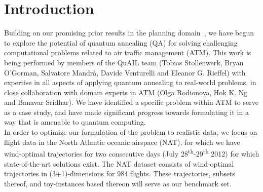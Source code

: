 \section*{Introduction}\label{sec:intro}
Building on our promising prior results in the planning domain~\cite{rieffel:15,venturelli:15},
we have begun to explore the potential of quantum annealing (QA) for solving challenging computational problems related to air traffic management (ATM)\cite{rodionova:16, rodionova:thesis15}.
This work is being performed by members of the QuAIL team (Tobias Stollenwerk, Bryan O'Gorman, Salvatore Mandr\`a, Davide Venturelli and Eleanor G. Rieffel) with expertise in all aspects of applying quantum annealing to real-world problems, in close collaboration with domain experts in ATM (Olga Rodionova, Hok K. Ng and Banavar Sridhar).
We have identified a specific problem within ATM to serve as a case study, and have made significant progress towards formulating it in a way that is amenable to quantum computing.\\

In order to optimize our formulation of the problem to realistic data, we focus on flight data in the North Atlantic oceanic airspace (NAT), for which we have wind-optimal trajectories for two consecutive days (July 28\textsuperscript{th}-29\textsuperscript{th} 2012) for which state-of-the-art solutions exist. 
The NAT dataset consists of wind-optimal trajectories in (3+1)-dimensions for 984 flights. 
These trajectories, subsets thereof, and toy-instances based thereon will serve as our benchmark set.


